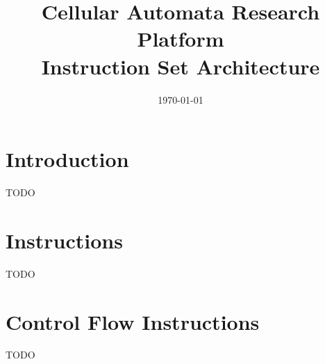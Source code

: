 \documentclass[a4paper]{article}
\title{Cellular Automata Research Platform\\Instruction Set Architecture}
\date{\today}
\begin{document}
\maketitle

\tableofcontents

\newpage

\setcounter{page}{1}

\section{Introduction}

TODO

\newpage

\section{Instructions}

TODO











\section{Control Flow Instructions}

TODO









\end{document}
